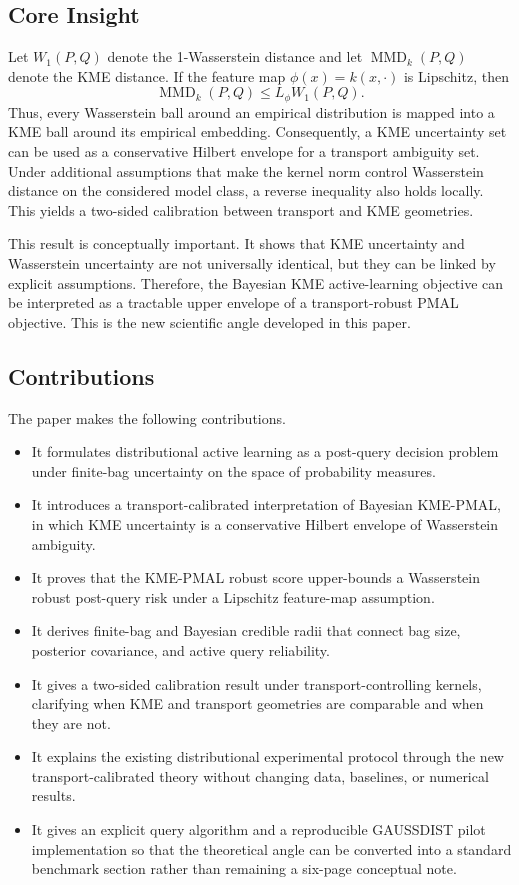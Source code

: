\documentclass[10pt,journal]{IEEEtran}
\DeclareMathOperator{\MMD}{MMD}
\begin{document}
\subsection{Core Insight}

Let $W_1(P,Q)$ denote the 1-Wasserstein distance and let $\MMD_k(P,Q)$ denote the KME distance. If the feature map $\phi(x)=k(x,\cdot)$ is Lipschitz, then
\begin{equation}
    \MMD_k(P,Q) \le L_\phi W_1(P,Q).
\end{equation}
Thus, every Wasserstein ball around an empirical distribution is mapped into a KME ball around its empirical embedding. Consequently, a KME uncertainty set can be used as a conservative Hilbert envelope for a transport ambiguity set. Under additional assumptions that make the kernel norm control Wasserstein distance on the considered model class, a reverse inequality also holds locally. This yields a two-sided calibration between transport and KME geometries.

This result is conceptually important. It shows that KME uncertainty and Wasserstein uncertainty are not universally identical, but they can be linked by explicit assumptions. Therefore, the Bayesian KME active-learning objective can be interpreted as a tractable upper envelope of a transport-robust PMAL objective. This is the new scientific angle developed in this paper.

\subsection{Contributions}

The paper makes the following contributions.
\begin{itemize}[leftmargin=1.1em]
    \item It formulates distributional active learning as a post-query decision problem under finite-bag uncertainty on the space of probability measures.
    \item It introduces a transport-calibrated interpretation of Bayesian KME-PMAL, in which KME uncertainty is a conservative Hilbert envelope of Wasserstein ambiguity.
    \item It proves that the KME-PMAL robust score upper-bounds a Wasserstein robust post-query risk under a Lipschitz feature-map assumption.
    \item It derives finite-bag and Bayesian credible radii that connect bag size, posterior covariance, and active query reliability.
    \item It gives a two-sided calibration result under transport-controlling kernels, clarifying when KME and transport geometries are comparable and when they are not.
    \item It explains the existing distributional experimental protocol through the new transport-calibrated theory without changing data, baselines, or numerical results.
    \item It gives an explicit query algorithm and a reproducible GAUSSDIST pilot implementation so that the theoretical angle can be converted into a standard benchmark section rather than remaining a six-page conceptual note.
\end{itemize}
\end{document}
